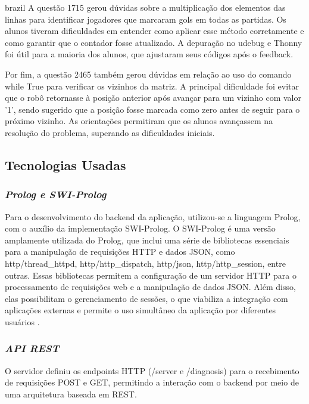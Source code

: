 \begin{otherlanguage*}{brazil}
A questão 1715 gerou dúvidas sobre a multiplicação dos elementos das linhas para identificar jogadores que marcaram gols em todas as partidas. Os alunos tiveram dificuldades em entender como aplicar esse método corretamente e como garantir que o contador fosse atualizado. A depuração no udebug e Thonny foi útil para a maioria dos alunos, que ajustaram seus códigos após o feedback.

Por fim, a questão 2465 também gerou dúvidas em relação ao uso do comando while True para verificar os vizinhos da matriz. A principal dificuldade foi evitar que o robô retornasse à posição anterior após avançar para um vizinho com valor '1', sendo sugerido que a posição fosse marcada como zero antes de seguir para o próximo vizinho. As orientações permitiram que os alunos avançassem na resolução do problema, superando as dificuldades iniciais.

\subsection{\textbf{Tecnologias Usadas}}

\subsubsection{\textbf{\textit{Prolog e SWI-Prolog}}}

Para o desenvolvimento do backend da aplicação, utilizou-se a linguagem Prolog, com o auxílio da implementação SWI-Prolog. O SWI-Prolog é uma versão amplamente utilizada do Prolog, que inclui uma série de bibliotecas essenciais para a manipulação de requisições HTTP e dados JSON, como http/thread\_httpd, http/http\_dispatch, http/json, http/http\_session, entre outras. Essas bibliotecas permitem a configuração de um servidor HTTP para o processamento de requisições web e a manipulação de dados JSON. Além disso, elas possibilitam o gerenciamento de sessões, o que viabiliza a integração com aplicações externas e permite o uso simultâneo da aplicação por diferentes usuários \cite{swiprologhttp}.

\subsubsection{\textbf{\textit{API REST}}}

O servidor definiu os endpoints HTTP (/server e /diagnosis) para o recebimento de requisições POST e GET, permitindo a interação com o backend por meio de uma arquitetura baseada em REST. 


\end{otherlanguage*}
